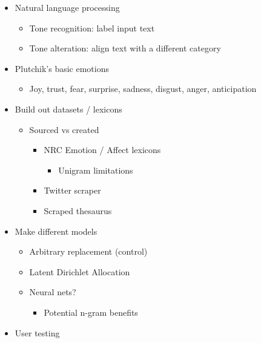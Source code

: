 \documentclass[12pt, oneside, reqno]{article}
\begin{document}


\startmain


\begin{itemize}
\item Natural language processing
\begin{itemize}
  \item Tone recognition: label input text
  \item Tone alteration: align text with a different category
\end{itemize}
\item Plutchik's basic emotions
\begin{itemize}
  \item Joy, trust, fear, surprise, sadness, disgust, anger, anticipation
\end{itemize}
\end{itemize}



\begin{itemize}
  \item Build out datasets / lexicons
  \begin{itemize}
    \item Sourced vs created
    \begin{itemize}
      \item NRC Emotion / Affect lexicons
      \begin{itemize}
        \item Unigram limitations
      \end{itemize}
      \item Twitter scraper
      \item Scraped thesaurus
    \end{itemize}
  \end{itemize}
  \item Make different models
  \begin{itemize}
    \item Arbitrary replacement (control)
    \item Latent Dirichlet Allocation
    \item Neural nets?
    \begin{itemize}
      \item Potential n-gram benefits
    \end{itemize}
  \end{itemize}
  \item User testing
\end{itemize}
\end{document}
